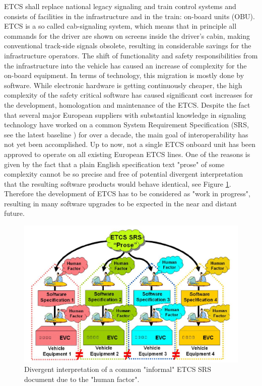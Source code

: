 \documentclass{template/openetcs_report}
\begin{document}
ETCS shall replace national legacy signaling and train control systems and consists of facilities in the infrastructure and in the train: on-board units (OBU). ETCS is a so called cab-signaling system, which means that in principle all commands for the driver are shown on screens inside the driver's cabin, making conventional track-side signals obsolete, resulting in considerable savings for the infrastructure operators. The shift of functionality and safety responsibilities from the infrastructure into the vehicle has caused an increase of complexity for the on-board equipment. In terms of technology, this migration is mostly done by software. While electronic hardware is getting continuously cheaper, the high complexity of the safety critical software has caused significant cost increases for the development, homologation and maintenance of the ETCS.
Despite the fact that several major European suppliers with substantial knowledge in signaling technology have worked on a common System Requirement Specification (SRS, see the latest baseline \cite{SRS-doc} ) for over a decade, the main goal of interoperability has not yet been accomplished. Up to now, not a single ETCS onboard unit has been approved to operate on all existing European ETCS lines. One of the reasons is given by the fact that a plain English specification text "prose" of some complexity cannot be so precise and free of potential divergent interpretation that the resulting software products would behave identical, see Figure \ref{fig:openETCS3}. Therefore the development of ETCS has to be considered as "work in progress", resulting in many software upgrades to be expected in the near and distant future.

\begin{figure}[h]
\centering
\includegraphics[width=12cm]{openETCS3}
\caption{Divergent interpretation of a common "informal" ETCS SRS document due to the "human factor".}
\label{fig:openETCS3}
\end{figure}
\end{document}
